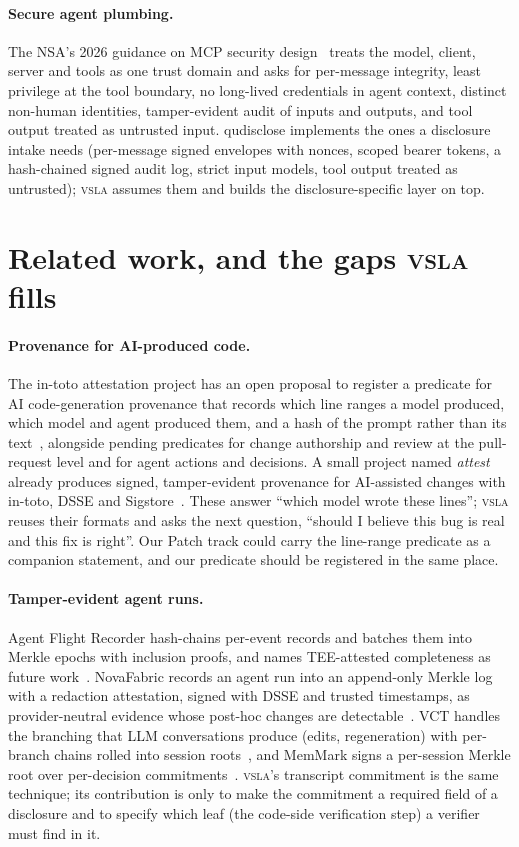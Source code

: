 \documentclass[11pt]{article}
\newcommand{\vsla}{\textsc{vsla}}
\begin{document}
\paragraph{Secure agent plumbing.}
The NSA's 2026 guidance on MCP security design~\cite{nsamcp} treats the model, client, server and tools as
one trust domain and asks for per-message integrity, least privilege at the tool boundary, no long-lived
credentials in agent context, distinct non-human identities, tamper-evident audit of inputs and outputs, and
tool output treated as untrusted input. qudisclose implements the ones a disclosure intake needs (per-message
signed envelopes with nonces, scoped bearer tokens, a hash-chained signed audit log, strict input models, tool
output treated as untrusted); \vsla{} assumes them and builds the disclosure-specific layer on top.

\section{Related work, and the gaps \vsla{} fills}
\label{sec:related}

\paragraph{Provenance for AI-produced code.}
The in-toto attestation project has an open proposal to register a predicate for AI code-generation provenance
that records which line ranges a model produced, which model and agent produced them, and a hash of the prompt
rather than its text~\cite{intoto604}, alongside pending predicates for change authorship and review at the
pull-request level and for agent actions and decisions. A small project named \emph{attest} already produces
signed, tamper-evident provenance for AI-assisted changes with in-toto, DSSE and Sigstore~\cite{attestproj}.
These answer ``which model wrote these lines''; \vsla{} reuses their formats and asks the next question,
``should I believe this bug is real and this fix is right''. Our Patch track could carry the line-range
predicate as a companion statement, and our predicate should be registered in the same place.

\paragraph{Tamper-evident agent runs.}
Agent Flight Recorder hash-chains per-event records and batches them into Merkle epochs with inclusion proofs,
and names TEE-attested completeness as future work~\cite{flightrecorder}. NovaFabric records an agent run into an
append-only Merkle log with a redaction attestation, signed with DSSE and trusted timestamps, as provider-neutral
evidence whose post-hoc changes are detectable~\cite{novafabric}. VCT handles the branching that LLM conversations
produce (edits, regeneration) with per-branch chains rolled into session roots~\cite{vct}, and MemMark signs a
per-session Merkle root over per-decision commitments~\cite{memmark}. \vsla{}'s transcript commitment is the same
technique; its contribution is only to make the commitment a required field of a disclosure and to specify which
leaf (the code-side verification step) a verifier must find in it.
\end{document}
